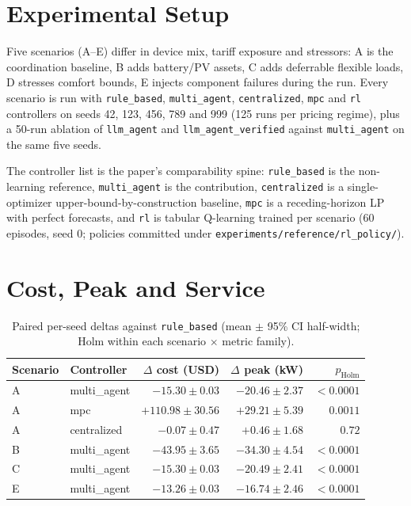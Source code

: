 
\section{Experimental Setup}\label{sec:setup}

Five scenarios (A--E) differ in device mix, tariff exposure and stressors:
A is the coordination baseline, B adds battery/PV assets, C adds deferrable
flexible loads, D stresses comfort bounds, E injects component failures during
the run. Every scenario is run with \texttt{rule\_based}, \texttt{multi\_agent},
\texttt{centralized}, \texttt{mpc} and \texttt{rl} controllers on seeds 42, 123,
456, 789 and 999 (125 runs per pricing regime), plus a 50-run ablation of
\texttt{llm\_agent} and \texttt{llm\_agent\_verified} against
\texttt{multi\_agent} on the same five seeds.

The controller list is the paper's comparability spine: \texttt{rule\_based} is
the non-learning reference, \texttt{multi\_agent} is the contribution,
\texttt{centralized} is a single-optimizer upper-bound-by-construction
baseline, \texttt{mpc} is a receding-horizon LP with perfect forecasts, and
\texttt{rl} is tabular Q-learning trained per scenario (60 episodes, seed 0;
policies committed under \texttt{experiments/reference/rl\_policy/}).

\section{Cost, Peak and Service}\label{sec:costpeak}


\begin{table}[t]
\centering
\caption{Paired per-seed deltas against \texttt{rule\_based}
(mean $\pm$ 95\% CI half-width; Holm within each scenario $\times$ metric
family).}
\label{tab:deltas}
\small
\begin{tabular}{llrrr}
\toprule
Scenario & Controller & $\Delta$ cost (USD) & $\Delta$ peak (kW) & $p_{\mathrm{Holm}}$ \\
\midrule
A & multi\_agent & $-15.30 \pm 0.03$ & $-20.46 \pm 2.37$ & $< 0.0001$ \\
A & mpc & $+110.98 \pm 30.56$ & $+29.21 \pm 5.39$ & $0.0011$ \\
A & centralized & $-0.07 \pm 0.47$ & $+0.46 \pm 1.68$ & $0.72$ \\
B & multi\_agent & $-43.95 \pm 3.65$ & $-34.30 \pm 4.54$ & $< 0.0001$ \\
C & multi\_agent & $-15.30 \pm 0.03$ & $-20.49 \pm 2.41$ & $< 0.0001$ \\
E & multi\_agent & $-13.26 \pm 0.03$ & $-16.74 \pm 2.46$ & $< 0.0001$ \\
\bottomrule
\end{tabular}
\end{table}

